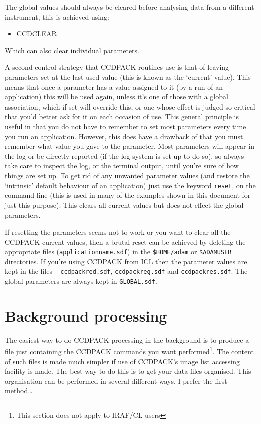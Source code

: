 \documentclass[twoside,11pt]{article}
\newcommand{\htmlref}[2]{#1}
\newcommand{\xlabel}[1]{}
\renewcommand{\_}{\texttt{\symbol{95}}}
\newcommand{\text}[1]{{\small \tt #1}}
\newcommand{\xroutine}[1]{\htmlref{{\sc #1}}{#1}}
\begin{document}
The global values should always be cleared before analysing data from a
different instrument, this is achieved using:
\begin{itemize}
\item \xroutine{CCDCLEAR}
\end{itemize}

Which can also clear individual parameters.

A second control strategy that CCDPACK routines use is that of leaving
parameters set at the last used value (this is known as the `current'
value).
This means that once a parameter has a value assigned to it (by a run
of an application) this will be used again, unless it's one of those
with a global association, which if set will override this, or one
whose effect is judged so critical that you'd better ask for it on
each occasion of use.
This general principle is useful in that you do not have to remember
to set most parameters every time you run an application.
However, this does have a drawback of that you must remember what
value you gave to the parameter.
Most parameters will appear in the log or be directly reported (if
the log system is set up to do so), so always take care to inspect
the log, or the terminal output, until you're sure of how things
are set up.
To get rid of any unwanted parameter values (and restore the
`intrinsic' default behaviour of an application) just use the keyword
\text{reset}, on the command line (this is used in many of the
examples shown in this document for just this purpose).
This clears all current values but does not effect the global
parameters.

If resetting the parameters seems not to work or you want to clear all
the CCDPACK current values, then a brutal reset can be achieved
by deleting the appropriate files (\text{application\_name.sdf}) in the
\text{\$HOME/adam} or \text{\$ADAM\_USER} directories. If you're using
CCDPACK from ICL then the parameter values are kept in the
files -- \text{ccdpack\_red.sdf}, \text{ccdpack\_reg.sdf} and
\text{ccdpack\_res.sdf}. The global parameters are always kept in
\text{GLOBAL.sdf}.

\section{\xlabel{backgroundprocessing}Background processing
         \label{backgroundprocessing}}

The easiest way to do CCDPACK processing in the background is to
produce a file just containing the CCDPACK commands you want
performed\footnote{This section does not apply to IRAF/CL users}. The
content of such files is made much simpler if use of CCDPACK's image
list accessing facility is made. The best way to do this is to get
your data files organised. This organisation can be performed in
several different ways, I prefer the first method\ldots
\end{document}

